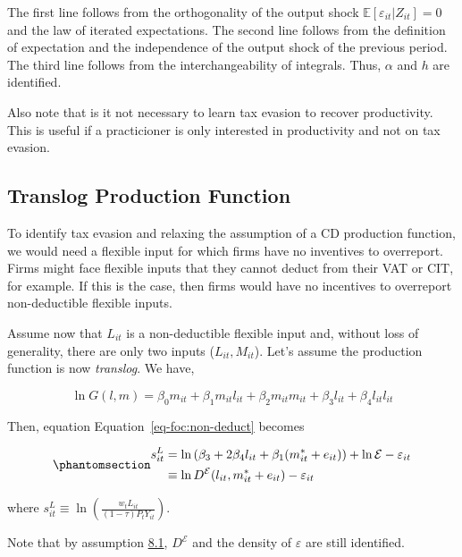 \documentclass[
  12pt]{article}
\theoremstyle{definition}
\theoremstyle{remark}
\begin{document}
The first line follows from the orthogonality of the output shock
\(\mathbb{E}[\varepsilon_{it}|Z_{it}]=0\) and the law of iterated
expectations. The second line follows from the definition of expectation
and the independence of the output shock of the previous period. The
third line follows from the interchangeability of integrals. Thus,
\(\alpha\) and \(h\) are identified.

Also note that is it not necessary to learn tax evasion to recover
productivity. This is useful if a practicioner is only interested in
productivity and not on tax evasion.

\subsection{Translog Production
Function}\label{translog-production-function}

To identify tax evasion and relaxing the assumption of a CD production
function, we would need a flexible input for which firms have no
inventives to overreport. Firms might face flexible inputs that they
cannot deduct from their VAT or CIT, for example. If this is the case,
then firms would have no incentives to overreport non-deductible
flexible inputs.

Assume now that \(L_{it}\) is a non-deductible flexible input and,
without loss of generality, there are only two inputs
(\(L_{it}, M_{it}\)). Let's assume the production function is now
\emph{translog}. We have,

\[
 \ln G(l,m)=\beta_0m_{it}+\beta_1m_{it}l_{it}+\beta_2m_{it}m_{it}+\beta_3l_{it}+\beta_4l_{it}l_{it}
\]

Then, equation Equation~\ref{eq-foc:non-deduct} becomes

\begin{equation}\phantomsection\label{eq-translog-share}{
\begin{aligned}
    s_{it}^{L}&=\ln \left(\beta_3+2\beta_4l_{it}+\beta_1(m^*_{it}+e_{it})\right) + \ln \mathcal{E}- \varepsilon_{it} \\
    &\equiv \ln D^{\mathcal{E}}(l_{it},m^*_{it}+e_{it})- \varepsilon_{it} 
\end{aligned}
}\end{equation}

where
\(s_{it}^{L} \equiv\ln\left(\frac{w_t L_{it}}{(1-\tau)P_{t}Y_{it}}\right)\).

Note that by assumption \hyperref[ass-non-ev]{8.1}, \(D^{\mathcal{E}}\)
and the density of \(\varepsilon\) are still identified.
\end{document}

